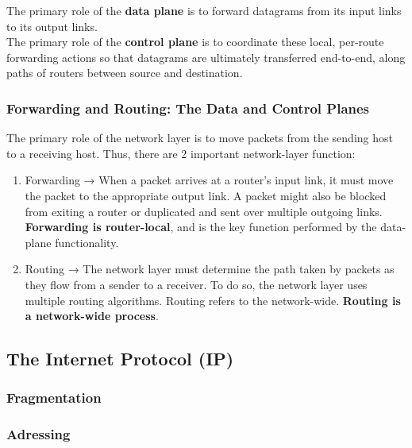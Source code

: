 \documentclass[12pt]{article}
\begin{document}
The primary role of the \textbf{data plane} is to forward datagrams from its input links to its output links. 
\vspace{0.5cm} \\
The primary role of the \textbf{control plane} is to coordinate these local, per-route forwarding actions so that datagrams are ultimately transferred end-to-end, along paths of routers between source and destination.

\subsubsection{Forwarding and Routing: The Data and Control Planes}

The primary role of the network layer is to move packets from the sending host to a receiving host. Thus, there are 2 important network-layer function:

\begin{enumerate}
    \item Forwarding → When a packet arrives at a router's input link, it must move the packet to the appropriate output link. A packet might also be blocked from exiting a router or duplicated and sent over multiple outgoing links. \\
    \textbf{Forwarding is router-local}, and is the key function performed by the data-plane functionality.
    \item Routing → The network layer must determine the path taken by packets as they flow from a sender to a receiver. To do so, the network layer uses multiple routing algorithms. Routing refers to the network-wide.   
    \textbf{Routing is a network-wide process}.
\end{enumerate}

\subsection{}

\subsection{The Internet Protocol (IP)}

\subsubsection{Fragmentation}

\subsubsection{Adressing}
\end{document}
